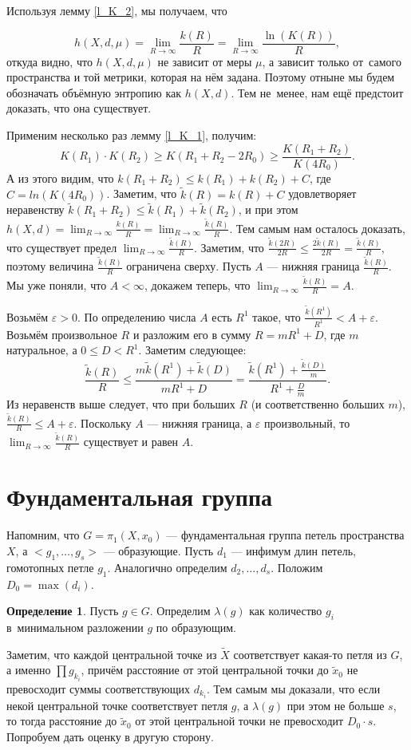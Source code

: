 \documentclass[11pt]{article}
\theoremstyle{definition}
\newtheorem{defin}{Определение}%
\theoremstyle{plain}
\theoremstyle{plain}
\def\leq{\leqslant}
\def\geq{\geqslant}
\def\wt#1{\widetilde{#1}}
\def\eps{\varepsilon}
\begin{document}
Используя лемму \ref{l_K_2}, мы получаем, что 

$$
	h(X, d, \mu) = \lim_{R \rightarrow \infty} \frac{k(R)} {R} = \lim_{R \rightarrow \infty} \frac{\ln (K(R))} {R},
$$
откуда видно, что $h(X, d, \mu)$ не зависит от меры $\mu$, а зависит только от~самого пространства и той метрики, которая на нём задана.
Поэтому отныне мы будем обозначать объёмную энтропию как $h(X, d)$.
Тем не~менее, нам ещё предстоит доказать, что она существует.

Применим несколько раз лемму \ref{l_K_1}, получим:
$$
  K(R_1) \cdot K(R_2) \geq K(R_1 + R_2 - 2 R_0) \geq \frac{K(R_1 + R_2)}{K(4 R_0)}.
$$
А из этого видим, что $k(R_1 + R_2) \leq k(R_1) + k(R_2) + C$, где $C = ln(K(4 R_0))$.
Заметим, что $\wt{k}(R) = k(R) + C$ удовлетворяет неравенству $\wt{k}(R_1 + R_2) \leq \wt{k}(R_1) + \wt{k}(R_2)$, и при этом
$h(X,d) = \lim_{R \rightarrow \infty} \frac{k(R)}{R} = \lim_{R \rightarrow \infty} \frac{\wt{k}(R)}{R}$.
Тем самым нам осталось доказать, что существует предел $\lim_{R \rightarrow \infty} \frac{\wt{k}(R)}{R}$.
Заметим, что $\frac{\wt{k}(2R)}{2R} \leq \frac{2\wt{k}(R)}{2R} = \frac{\wt{k}(R)}{R}$, поэтому величина $\frac{\wt{k}(R)}{R}$ ограничена сверху.
Пусть $A$ --- нижняя граница $\frac{\wt{k}(R)}{R}$. 
Мы уже поняли, что $A < \infty$, докажем теперь, что $\lim_{R \rightarrow \infty} \frac{\wt{k}(R)}{R} = A$.

Возьмём $\eps > 0$. По определению числа $A$ есть $R^1$ такое, что $\frac{\wt{k}(R^1)}{R^1} < A + \eps$. 
Возьмём произвольное $R$ и разложим его в сумму $R = m R^1 + D$, где $m$ натуральное, а $0 \leq D < R^1$. 
Заметим следующее:
$$
\frac{\wt{k}(R)}{R} \leq 
\frac{m \wt{k}(R^1) + \wt{k}(D)}{m R^1 + D} =
\frac{\wt{k}(R^1) + \frac{\wt{k}(D)}{m}}{R^1 + \frac{D}{m}} .
$$
Из неравенств выше следует, что при больших $R$ (и соответственно больших $m$), $\frac{\wt{k}(R)}{R} \leq A + \eps$. 
Поскольку $A$ --- нижняя граница, а $\eps$ произвольный, то $\lim_{R \rightarrow \infty} \frac{\wt{k}(R)}{R}$ существует и равен $A$.




\section{Фундаментальная группа}
Напомним, что $G = \pi_1(X, x_0)$ --- фундаментальная группа петель пространства $X$, а $<g_1,\dots,g_s>$ --- образующие.
Пусть $d_1$ --- инфимум длин петель, гомотопных петле $g_1$. Аналогично определим $d_2,\dots,d_s$.
Положим $D_0 = \max(d_i)$.
\begin{defin}
Пусть $g \in G$. Определим $\lambda(g)$ как количество $g_i$ в~минимальном разложении $g$ по образующим.
\end{defin}
Заметим, что каждой центральной точке из $\wt{X}$ соответствует какая-то петля из $G$, а именно $\prod g_{k_i}$, 
причём расстояние от этой центральной точки до $\wt{x}_0$ не превосходит суммы соответствующих $d_{k_i}$. 
Тем самым мы доказали, что если некой центральной точке соответствует петля $g$, а
$\lambda(g)$ при этом не больше $s$, то тогда расстояние до $\wt{x}_0$ от этой центральной точки не превосходит $D_0 \cdot s$.
Попробуем дать оценку в другую сторону.
\end{document}
